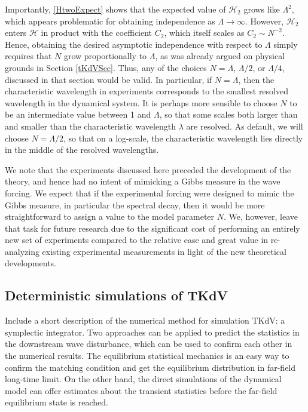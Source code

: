 \documentclass[11pt]{article}
\newcommand{\nick}[1]{{\color{red} #1}}
\newcommand{\lam}{\lambda}
\newcommand{\lamfac}{N}
\newcommand{\Ham}{\mathcal{H}}
\newcommand{\Htwo}{\Ham_{2}}
\begin{document}
	Importantly, \eqref{HtwoExpect} shows that the expected value of $\Htwo$ grows like $\Lambda^2$, which appears problematic for obtaining independence as $\Lambda \to \infty$. However, $\Htwo$ enters $\Ham$ in product with the coefficient $C_2$, which itself scales as $C_2 \sim \lamfac^{-2}$. Hence, obtaining the desired asymptotic independence with respect to $\Lambda$ simply requires that $\lamfac$ grow proportionally to $\Lambda$, as was already argued on physical grounds in Section \ref{tKdVSec}. 
Thus, any of the choices $\lamfac = \Lambda$, $\Lambda/2$, or $\Lambda/4$, discussed in that section would be valid. In particular, if $\lamfac = \Lambda$, then the characteristic wavelength in experiments corresponds to the smallest resolved wavelength in the dynamical system. It is perhaps more sensible to choose $\lamfac$ to be an intermediate value between 1 and $\Lambda$, so that some scales both larger than and smaller than the characteristic wavelength $\lam$ are resolved. As default, we will choose $\lamfac = \Lambda/2$, so that on a log-scale, the characteristic wavelength lies directly in the middle of the resolved wavelengths. 

	We note that the experiments discussed here preceded the development of the theory, and hence had no intent of mimicking a Gibbs measure in the wave forcing. We expect that if the experimental forcing were designed to mimic the Gibbs measure, in particular the spectral decay, then it would be more straightforward to assign a value to the model parameter $\lamfac$. We, however, leave that task for future research due to the significant cost of performing an entirely new set of experiments compared to the relative ease and great value in re-analyzing existing experimental measurements in light of the new theoretical developments.

\subsection{Deterministic simulations of TKdV}

\nick{Include a short description of the numerical method for simulation TKdV: a symplectic integrator.}
Two approaches can be applied to predict the statistics in the
downstream wave disturbance, which can be used to confirm each other in
the numerical results. The equilibrium statistical mechanics
is an easy way to confirm the matching condition and get the equilibrium
distribution in far-field long-time limit. On the other hand, the
direct simulations of the dynamical model can offer estimates about
the transient statistics before the far-field equilibrium state is
reached. 
\end{document}

